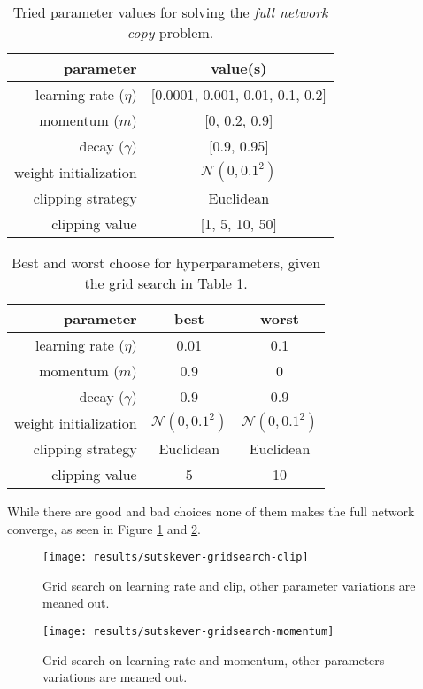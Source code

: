 \begin{table}[h]
\centering
\begin{tabular}{r|c}
	parameter & value(s) \\ \hline
	learning rate ($\eta$) & [0.0001, 0.001, 0.01, 0.1, 0.2] \\
	momentum ($m$) & [0, 0.2, 0.9] \\
	decay ($\gamma$) & [0.9, 0.95] \\
	weight initialization & $\mathcal{N}(0, 0.1^2)$ \\
	clipping strategy & Euclidean \\
	clipping value & [1, 5, 10, 50]
\end{tabular}
\caption{Tried parameter values for solving the \textit{full network copy} problem.}
\label{table:resutls:sutskever:gridsearch-range}
\end{table}
\begin{table}[h]
\vspace{-0.5cm}
\centering
\begin{tabular}{r|c|c}
	parameter & best & worst  \\ \hline
	learning rate ($\eta$) & 0.01 & 0.1 \\
	momentum ($m$) & 0.9 & 0 \\
	decay ($\gamma$) & 0.9 & 0.9 \\
	weight initialization & $\mathcal{N}(0, 0.1^2)$ & $\mathcal{N}(0, 0.1^2)$ \\
	clipping strategy & Euclidean & Euclidean \\
	clipping value & 5 & 10
\end{tabular}
\caption{Best and worst choose for hyperparameters, given the grid search in Table \ref{table:resutls:sutskever:gridsearch-range}.}
\end{table}

While there are good and bad choices none of them makes the full network converge, as seen in Figure \ref{fig:results:sutskever:gridsearch-clip} and \ref{fig:results:sutskever:gridsearch-momentum}.
\begin{figure}[h]
	\centering
	\texttt{[image: results/sutskever-gridsearch-clip]}
	\caption{Grid search on learning rate and clip, other parameter variations are meaned out.}
	\label{fig:results:sutskever:gridsearch-clip}
\end{figure}
\begin{figure}[H]
	\centering
	\texttt{[image: results/sutskever-gridsearch-momentum]}
	\caption{Grid search on learning rate and momentum, other parameters variations are meaned out.}
	\label{fig:results:sutskever:gridsearch-momentum}
\end{figure}

